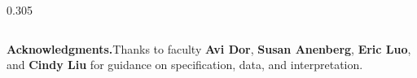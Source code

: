 \documentclass[final,t]{beamer}
\begin{document}
\begin{frame}[t,fragile]
\begin{columns}[t]
\begin{column}{0.305\paperwidth}
\end{column}
\end{columns}

\vspace{5mm}
\begin{tcolorbox}[
  enhanced,
  colback=gwblue,
  colframe=gwblue,
  arc=0mm,
  left=10mm,right=10mm,top=3mm,bottom=3mm,
  boxrule=0pt
]
\centering\color{white}\normalsize
\textbf{Acknowledgments.}\enspace Thanks to faculty \textbf{Avi Dor}, \textbf{Susan Anenberg}, \textbf{Eric Luo}, and \textbf{Cindy Liu} for guidance on specification, data, and interpretation.
\end{tcolorbox}

\end{frame}
\end{document}
